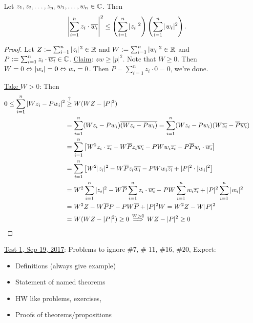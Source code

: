 \documentclass[]{article}
\begin{document}
\begin{theorem}
	 Let $z_1,z_2,\dots,z_n,w_1,\dots,w_n\in\mathbb{C}$. Then $$ \left| \sum_{i=1}^n z_i\cdot \overline{w_i} \right|^2 \leq \left(\sum_{i=1}^n |z_i|^2 \right) \left( \sum_{i=1}^n |w_i|^2\right).$$
\end{theorem}
\begin{proof}
	Let $Z:= \sum_{i=1}^n |z_i|^2 \in\mathbb{R}$ and $W: = \sum_{i=1}^n |w_i|^2\in\mathbb{R}$ and $P:=\sum_{i=1}^n z_i\cdot \overline{w_i}\in\mathbb{C}$. \ul{Claim}: $zw \geq |p|^2$. Note that $W \geq 0$. Then $W = 0 \Leftrightarrow |w_i| = 0 \Leftrightarrow w_i = 0$. Then $P = \sum_{i=1}^n z_i\cdot 0 = 0$, we're done.
	
	\ul{Take $W>0$}: Then 
	\begin{align*}
		0\leq \sum_{i=1}^n |Wz_i - Pw_i|^2 &\overset{?}{\geq} W(WZ-|P|^2) \\
		&= \sum_{i=1}^n(Wz_i-Pw_i)\overline{(Wz_i-Pw_i)} = \sum_{i=1}^n(Wz_i-Pw_i)(W\overline{z_i}-\overline{P}\overline{w_i}) \\
		& = \sum_{i=1}^n \left[ W^2 z_i\cdot \overline{z_i} - W\overline{P} z_i \overline{w_i} - PW w_i \overline{z_i} + P\overline{P} w_i \cdot \overline{w_i} \right] \\
		&= \sum_{i=1}^n \left[ W^2|z_i|^2 - W\overline{P} z_i \overline{w_i} - PW w_i \overline{z_i} + |P|^2 \cdot |w_i|^2 \right] \\
		&= W^2 \sum_{i=1}^n |z_i|^2 - W\overline{P}\sum_{i=1}^n z_i \cdot \overline{w_i} - PW \sum_{i=1}^n w_i \overline{z_i} + |P|^2 \sum_{i=1}^n |w_i|^2 \\
		&= W^2 Z  - W\overline{P} P - P W \overline{P} + |P|^2 W = W^2Z - W|P|^2 \\
		&= W(WZ-|P|^2) \geq 0 \overset{W>0}{\implies} WZ-|P|^2 \geq 0
	\end{align*}
\end{proof}

\ul{Test 1, Sep 19, 2017}: Problems to ignore \#7, \# 11, \#16, \#20, Expect:
\begin{itemize}
	\item Definitions (always give example)
	\item Statement of named theorems
	\item HW like problems, exercises,
	\item Proofs of theorems/propositions
\end{itemize}
\end{document}
